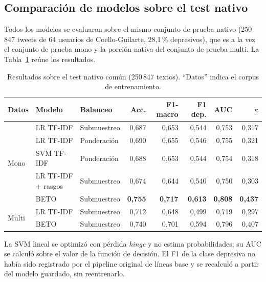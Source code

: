 \documentclass[12pt,a4paper]{article}
\begin{document}
\subsection{Comparación de modelos sobre el test nativo}
Todos los modelos se evaluaron sobre el mismo conjunto de prueba nativo (250\,847 tweets de 64 usuarios de Coello-Guilarte, 28{,}1\,\% depresivos), que es a la vez el conjunto de prueba mono y la porción nativa del conjunto de prueba multi. La Tabla~\ref{tab:leaderboard} reúne los resultados.

\begin{table}[H]
\centering
\footnotesize
\setlength{\tabcolsep}{4pt}
\caption{Resultados sobre el test nativo común (250\,847 textos). ``Datos'' indica el corpus de entrenamiento.}
\label{tab:leaderboard}
\begin{tabular}{lllrrrrr}
\toprule
\textbf{Datos} & \textbf{Modelo} & \textbf{Balanceo} & \textbf{Acc.} & \textbf{F1-macro} & \textbf{F1 dep.} & \textbf{AUC} & \textbf{$\kappa$} \\
\midrule
\multirow{5}{*}{Mono}
 & LR TF-IDF             & Submuestreo & 0{,}687 & 0{,}653 & 0{,}544 & 0{,}753 & 0{,}317 \\
 & LR TF-IDF             & Ponderación & 0{,}690 & 0{,}655 & 0{,}546 & 0{,}755 & 0{,}321 \\
 & SVM TF-IDF            & Ponderación & 0{,}688 & 0{,}653 & 0{,}544 & 0{,}754 & 0{,}318 \\
 & LR TF-IDF + rasgos    & Submuestreo & 0{,}674 & 0{,}644 & 0{,}540 & 0{,}750 & 0{,}303 \\
 & \cellcolor{filaResaltada}BETO & \cellcolor{filaResaltada}Submuestreo & \cellcolor{filaResaltada}\textbf{0{,}755} & \cellcolor{filaResaltada}\textbf{0{,}717} & \cellcolor{filaResaltada}\textbf{0{,}613} & \cellcolor{filaResaltada}\textbf{0{,}808} & \cellcolor{filaResaltada}\textbf{0{,}437} \\
\midrule
\multirow{2}{*}{Multi}
 & LR TF-IDF             & Submuestreo & 0{,}712 & 0{,}648 & 0{,}499 & 0{,}719 & 0{,}297 \\
 & BETO                  & Submuestreo & 0{,}740 & 0{,}701 & 0{,}594 & 0{,}796 & 0{,}407 \\
\bottomrule
\end{tabular}

\vspace{0.15cm}
{\footnotesize La SVM lineal se optimizó con pérdida \emph{hinge} y no estima probabilidades; su AUC se calculó sobre el valor de la función de decisión. El F1 de la clase depresiva no había sido registrado por el pipeline original de líneas base y se recalculó a partir del modelo guardado, sin reentrenarlo.}
\end{table}
\end{document}
